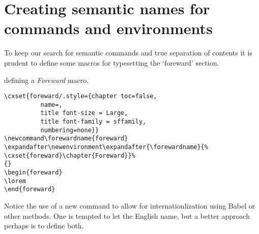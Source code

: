 \section{Creating semantic names for commands and environments}

To keep our search for semantic commands and true separation of contents it is prudent to define some macros for typesetting the  `foreward' section.

\begin{texexample}{defining a \textit{Foreward} macro.}{}
\begin{lstlisting}
\cxset{foreward/.style={chapter toc=false,
          name=,
          title font-size = Large,
          title font-family = sffamily,
          numbering=none}}
\newcommand\forewardname{foreward}
\expandafter\newenvironment\expandafter{\forewardname}{%
\cxset{foreward}\chapter{Foreward}}%
{}
\begin{foreward}
\lorem
\end{foreward}
\end{lstlisting}
\end{texexample}


Notice the use of a new command  to allow for internationlization using Babel or other methods. One is tempted to let the English name, but a better approach perhaps is to define both.

\makeatletter
\MakePercentIgnore

